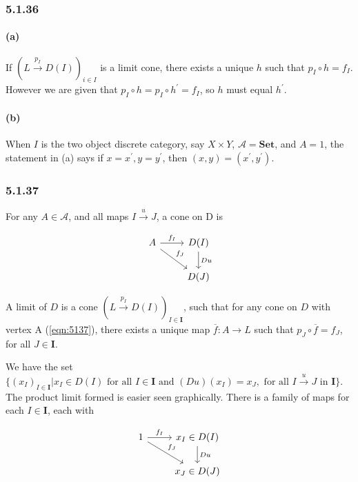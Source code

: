 \documentclass{article}
\begin{document}
\subsubsection*{5.1.36}

\paragraph{(a)}

If $(L \xrightarrow{p_I} D(I))_{i \in I}$ is a limit cone, there exists a unique $h$ such that $p_I \circ h = f_I$. However we are given that $p_I \circ h = p_I \circ h^\prime = f_I$, so $h$ must equal $h^\prime$.

\paragraph{(b)}

When $I$ is the two object discrete category, say $X \times Y$, $\mathcal{A}=\mathbf{Set}$, and $A=1$, the statement in (a) says if $x = x^\prime, y = y^\prime$, then $(x, y) = (x^\prime, y^\prime)$.

\subsubsection*{5.1.37}

For any $A \in \mathcal{A}$, and all maps $I \xrightarrow{u} J$, a cone on D is

\begin{equation}
\label{eqn:5137}
\begin{tikzcd}
A \arrow{r}{f_I} \arrow{rd}{f_J}
  & D(I) \arrow{d}{Du} \\
    & D(J)
  \end{tikzcd}
\end{equation}

A limit of $D$ is a cone $(L \xrightarrow{p_I} D(I))_{I \in \mathbf{I}}$, such that for any cone on $D$ with vertex A (\ref{eqn:5137}), there exists a unique map $\overline{f}\colon A \rightarrow L$ such that $p_J \circ \overline{f} = f_J$, for all $J \in \mathbf{I}$.

We have the set $\{ (x_I)_{I \in \mathbf{I}} | x_I \in D(I) \text{ for all } I\in \mathbf{I} \text{ and } (Du)(x_I)=x_J, \text{ for all } I \xrightarrow{u} J \text{ in } \mathbf{I} \}.$ The product limit formed is easier seen graphically. There is a family of maps for each $I \in \mathbf{I}$, each with

\begin{equation*}
\begin{tikzcd}
1 \arrow{r}{f_I} \arrow{rd}{f_J}
  & x_I \in D(I) \arrow{d}{Du} \\
    & x_J \in D(J)
  \end{tikzcd}
\end{equation*}
\end{document}
